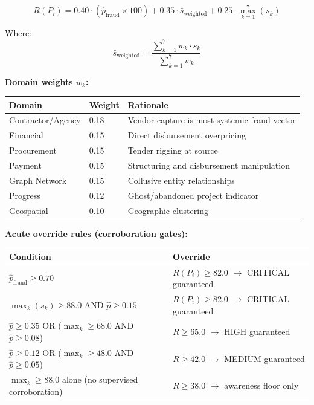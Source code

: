 \documentclass[11pt,a4paper]{article}
\begin{document}
\[ R(P_i) = 0.40 \cdot (\hat{p}_\text{fraud} \times 100) + 0.35 \cdot \bar{s}_\text{weighted} + 0.25 \cdot \max_{k=1}^{7}(s_k) \]

Where:
\[ \bar{s}_\text{weighted} = \frac{\sum_{k=1}^{7} w_k \cdot s_k}{\sum_{k=1}^{7} w_k} \]

\textbf{Domain weights $w_k$:}

\begin{table}[htbp]
\centering
\small
\begin{tabularx}{\textwidth}{l l Y}
\toprule
\textbf{Domain} & \textbf{Weight} & \textbf{Rationale} \\
\midrule
Contractor/Agency & 0.18 & Vendor capture is most systemic fraud vector \\
Financial & 0.15 & Direct disbursement overpricing \\
Procurement & 0.15 & Tender rigging at source \\
Payment & 0.15 & Structuring and disbursement manipulation \\
Graph Network & 0.15 & Collusive entity relationships \\
Progress & 0.12 & Ghost/abandoned project indicator \\
Geospatial & 0.10 & Geographic clustering \\
\bottomrule
\end{tabularx}
\end{table}


\textbf{Acute override rules (corroboration gates):}

\begin{table}[htbp]
\centering
\small
\begin{tabularx}{\textwidth}{l Y}
\toprule
\textbf{Condition} & \textbf{Override} \\
\midrule
$\hat{p}_\text{fraud} \geq 0.70$ & $R(P_i) \geq 82.0$ $\rightarrow$ CRITICAL guaranteed \\
$\max_k(s_k) \geq 88.0$ AND $\hat{p} \geq 0.15$ & $R(P_i) \geq 82.0$ $\rightarrow$ CRITICAL guaranteed \\
$\hat{p} \geq 0.35$ OR ($\max_k \geq 68.0$ AND $\hat{p} \geq 0.08$) & $R \geq 65.0$ $\rightarrow$ HIGH guaranteed \\
$\hat{p} \geq 0.12$ OR ($\max_k \geq 48.0$ AND $\hat{p} \geq 0.05$) & $R \geq 42.0$ $\rightarrow$ MEDIUM guaranteed \\
$\max_k \geq 88.0$ alone (no supervised corroboration) & $R \geq 38.0$ $\rightarrow$ awareness floor only \\
\bottomrule
\end{tabularx}
\end{table}
\end{document}
